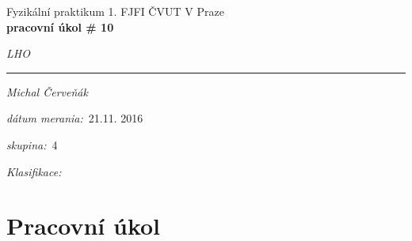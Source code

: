 \documentclass[a4paper,10pt]{article}
\begin{document}
\def\mean#1{\left< #1 \right>}
\noindent
{\large Fyzikální praktikum 1.} \hfil {\large FJFI ČVUT V Praze}\\
\noindent
{\large\textbf{pracovní úkol \# 10}}
\begin{center}
{\large\textit{LHO}}
\end{center}
\noindent
\rule{\textwidth}{1px}
\vspace{\baselineskip}

\emph{Michal Červeňák}
\par
\vspace{\baselineskip}
\begin{minipage}[l]{0.5\textwidth}%
\textit{dátum merania:}~21.11. 2016\\%
\par%
\noindent%
\textit{skupina:}~4\\%
\par%
\noindent%
\textit{Klasifikace:}\dotfill\\%
\end{minipage}

\section{Pracovní úkol}
\end{document}
